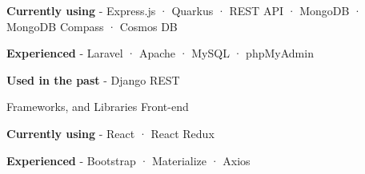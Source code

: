 \begin{cventries}
{\begin{cvitems}
    \item {\textbf{Currently using} \hspace{0.03cm} - \hspace{0.03cm} Express.js \hspace{0.03cm} · \hspace{0.03cm} Quarkus \hspace{0.03cm} · \hspace{0.03cm} REST API \hspace{0.03cm} · \hspace{0.03cm} MongoDB \hspace{0.03cm} · \hspace{0.03cm} MongoDB Compass \hspace{0.03cm} · \hspace{0.03cm} Cosmos DB} %
    \item {\textbf{Experienced} \hspace{0.03cm} - \hspace{0.03cm} Laravel \hspace{0.03cm} · \hspace{0.03cm} Apache \hspace{0.03cm} · \hspace{0.03cm} MySQL \hspace{0.03cm} · \hspace{0.03cm} phpMyAdmin} %
    \item {\textbf{Used in the past} \hspace{0.03cm} - \hspace{0.03cm} Django REST \\} %
  \end{cvitems}
}
  \cventry
    {Frameworks, and Libraries} %
    {Front-end} %
    {} %
    {} %
    {
      \begin{cvitems} %
        \item {\textbf{Currently using} \hspace{0.03cm} - \hspace{0.03cm} React \hspace{0.03cm} · \hspace{0.03cm} React Redux} %
        \item {\textbf{Experienced} \hspace{0.03cm} - \hspace{0.03cm} Bootstrap \hspace{0.03cm} · \hspace{0.03cm} Materialize \hspace{0.03cm} · \hspace{0.03cm} Axios} %

\end{cvitems}}
\end{cventries}
